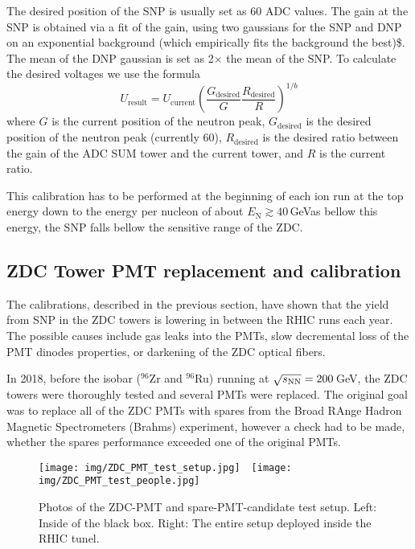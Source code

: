 The desired position of the SNP is usually set as 60 ADC values. The gain at the SNP is obtained via a fit of the gain, using two gaussians for the SNP and DNP on an exponential background (which empirically fits the background the best)\$. The mean of the DNP gaussian is set as 2$\times$ the mean of the SNP\@.
To calculate
the desired voltages we use the formula
\begin{equation}
U_{\text{result}} = U_\text{current}\left(\frac{G_\text{desired}}{G} 
\frac{R_\text{desired}}{R}\right)^{1/b}
\end{equation}
where $G$ is the current position of the neutron peak, $G_\text{desired}$ is the desired position
of the neutron peak (currently 60), $R_\text{desired}$ is the desired ratio between the gain of the ADC SUM
tower and the current tower, and $R$ is the current ratio.

This calibration has to be performed at the beginning of each ion run at the top energy down to the energy per nucleon of about $E_\mathrm{N}\gtrsim40\,$GeV\@ as bellow this energy, the SNP falls bellow the sensitive range of the ZDC\@.

\subsection{\label{ZdcPmtTest}ZDC Tower PMT replacement and calibration}
The calibrations, described in the previous section, have shown that the yield from SNP in the ZDC towers is lowering in between the RHIC runs each year. The possible causes include gas leaks into the PMTs, slow decremental loss of the PMT dinodes properties, or darkening of the ZDC optical fibers. 

In 2018, before the isobar (${}^{96}$Zr and ${}^{96}$Ru) running at $\sqrt{s_\text{NN}} = 200\,$GeV, the ZDC towers were thoroughly tested and several PMTs were replaced. The original goal was to replace all of the ZDC PMTs with spares from the Broad RAnge Hadron Magnetic Spectrometers (Brahms) experiment, however a check had to be made, whether the spares performance exceeded one of the original PMTs.

\begin{figure}[!htb]
\begin{center}
 \texttt{[image: img/ZDC\_PMT\_test\_setup.jpg]}$\quad$\texttt{[image: img/ZDC\_PMT\_test\_people.jpg]}
\end{center}
\caption[Photos of the ZDC-PMT and  test setup for spare-PMT candidates.]{\label{photo_ZDC_PTM_setup}Photos of the ZDC-PMT and spare-PMT-candidate test setup. Left: Inside of the black box. Right: The entire setup deployed inside the RHIC tunel.}
\end{figure}

